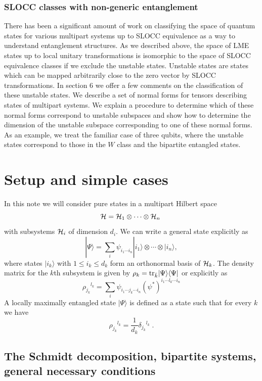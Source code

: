 \documentclass[12pt]{article}
\theoremstyle{definition}
\newcommand{\be}{\begin{equation}}
\newcommand{\ee}{\end{equation}}
\newcommand{\tr}{{\rm tr}}
\begin{document}
\subsubsection*{SLOCC classes with non-generic entanglement}

There has been a significant amount of work on classifying the space of quantum states for various multipart systems up to SLOCC equivalence as a way to understand entanglement structures. As we described above, the space of LME states up to local unitary transformations is isomorphic to the space of SLOCC equivalence classes if we exclude the unstable states. Unstable states are states which can be mapped arbitrarily close to the zero vector by SLOCC transformations. In section 6 we offer a few comments on the classification of these  unstable states. We describe a set of normal forms for tensors describing states of multipart systems. We explain a procedure to determine which of these normal forms correspond to unstable subspaces and show how to determine the dimension of the unstable subspace corresponding to one of these normal forms. As an example, we treat the familiar case of three qubits, where the unstable states correspond to those in the $W$ class and the bipartite entangled states.



\section{Setup and simple cases}

In this note we will consider pure states in a multipart Hilbert space
\[
{\cal H} = {\cal H}_{1}  \otimes \cdots  \otimes {\cal H}_{n} \;  
\]
with subsystems ${\cal H}_i$ of dimension $d_i$. We can write a general state explicitly as
\be
|\Psi \rangle = \sum_i \psi_{i_1 \cdots i_n} |i_1 \rangle  \otimes \cdots  \otimes |i_n \rangle,
\ee
where states $|i_k \rangle$ with $1 \le i_k \le d_k$ form an orthonormal basis of ${\cal H}_k$. The density matrix for the $k$th subsystem is given by $\rho_k = \tr_{\bar{k}} | \Psi \rangle \langle \Psi |$ or explicitly as
\be
\rho_{j_k} {}^{l_k} = \sum_{i}  \psi_{i_1 \cdots j_k \cdots i_n}(\psi^*)^{i_1 \cdots l_k \cdots i_n}
\ee
A locally maximally entangled state $|\Psi \rangle$ is defined as a state such that for every $k$ we have
\be
\rho_{j_k} {}^{l_k} = \frac{1}{d_k} \delta_{j_k} {}^{l_k} \; .
\ee

\subsection{The Schmidt decomposition, bipartite systems, general necessary conditions}
\end{document}
